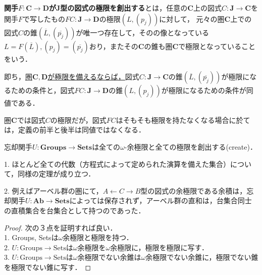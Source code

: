 \documentclass[uplatex, 12pt, dvipdfmx]{jsarticle}
\begin{document}
\begin{definition}
    \textbf{関手$F:\mathbf{C\to D}$が$\mathbf{J}$型の図式の極限を創出する}とは，任意の$\mathbf{C}$上の図式$C:\mathbf{J\to C}$を関手$F$で写したもの$FC:\mathbf{J\to D}$の極限$(L,(p_j))$に対して，
    元々の圏$\mathbf{C}$上での図式$C$の錐$(\overline{L},(\overline{p_j}))$が唯一つ存在して，そのの像となっている$L=F(\overline{L}), (p_j)=(\overline{p_j})$おり，またその$\mathbf{C}$の錐も圏$\mathbf{C}$で極限となっていることをいう．

    即ち，\underline{圏$\mathbf{C,D}$が極限を備えるならば，}図式$C:\mathbf{J\to C}$の錐$(\overline{L},(\overline{p_j}))$が極限になるための条件と，図式$FC:\mathbf{J\to D}$の錐$(L,(p_j))$が極限になるための条件が同値である．
\end{definition}
\begin{remark*}
    圏$\mathbf{C}$では図式$C$の極限だが，図式$FC$はそもそも極限を持たなくなる場合に於ては，定義の前半と後半は同値ではなくなる．
\end{remark*}
\begin{proposition}
    忘却関手$U:\mathbf{Groups\to Sets}$は全ての$\omega$-余極限と全ての極限を創出する(create)．
\end{proposition}
\begin{remark*}
    1. ほとんど全ての代数（方程式によって定められた演算を備えた集合）について，同様の定理が成り立つ．

    2. 例えばアーベル群の圏にて，$A\leftarrow C\rightarrow B$型の図式の余極限である余積は，忘却関手$U:\mathbf{Ab\to Sets}$によっては保存されず，アーベル群の直和は，台集合同士の直積集合を台集合として持つのであった．
\end{remark*}
\begin{proof}
    次の３点を証明すれば良い．\\ 1. Groups, Setsは$\omega$余極限と極限を持つ．\\2. $U:\mathrm{Groups\to Sets}$は$\omega$余極限を$\omega$余極限に，極限を極限に写す．\\3. $U:\mathrm{Groups\to Sets}$は$\omega$余極限でない余錐は$\omega$余極限でない余錐に，極限でない錐を極限でない錐に写す．
\end{proof}
\end{document}
